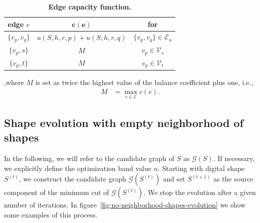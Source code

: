 \documentclass[smallextended]{svjour3}
\begin{document}
\begin{table}
\begin{center}
\begin{tabular}{|c|c|c|}
\hline
\textbf{edge} $e$ & $\mathbf{c(e)}$ & \textbf{for}\\
\hline
$\{v_p, v_q\}$ & $ u(S,h,r,p) + u(S,h,r,q) $ & $\{v_p,v_q\} \in \mathcal{E}_{u}$\\
\hline
$\{v_p, s\}$ & $M$ & $v_p \in \mathcal{V}_{s}$ \\
\hline
$\{v_p, t\}$ & $M$ & $v_p \in \mathcal{V}_{t}$ \\
\hline
\end{tabular}
\end{center}
,where $M$ is set as twice the highest value of the balance coefficient plus one, i.e.,
\begin{align*}
	M &= \max_{e \in \mathcal{E} }{ c(e) }.
\end{align*}
\caption{\textbf{Edge capacity function.}}
\label{tab:edge-capacity}
\end{table}

\subsection{Shape evolution with empty neighborhood of shapes}

In the following, we will refer to the candidate graph of $S$ as $\mathcal{G}(S)$. If necessary, we explicitly define the optimization band value $n$. Starting with digital shape $S^{(t)}$, we construct the candidate graph $\mathcal{G}(S^{(t)})$ and set $S^{(t+1)}$ as the source component of the minimum cut of $\mathcal{G}(S^{(t)})$. We stop the evolution after a given number of iterations.  In figure~\ref{fig:no-neighborhood-shapes-evolution} we show some examples of this process.
\end{document}

